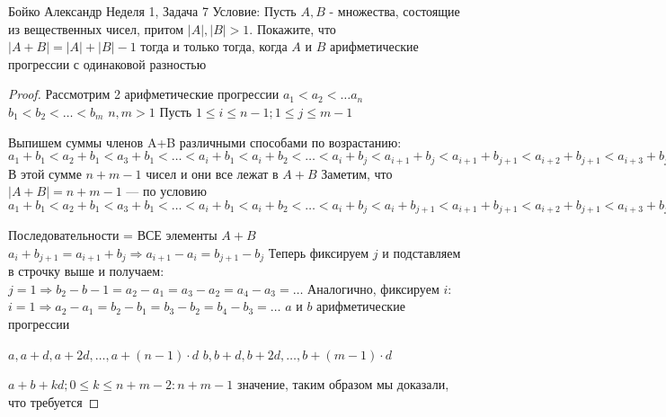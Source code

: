 \documentclass[a4paper,12pt]{article}
\numberwithin{equation}{section}
\theoremstyle{plain}
\theoremstyle{definition}
\theoremstyle{remark}
\begin{document}

Бойко Александр
\newline
\newline
Неделя 1, Задача 7 \newline
Условие:
 Пусть $A, B$ - множества, состоящие из вещественных чисел, притом $|A|, |B| > 1$. Покажите, что
$|A + B| = |A| + |B| - 1$ тогда и только тогда, когда $A$ и $B$ арифметические прогрессии с одинаковой разностью
\begin{proof}
Рассмотрим 2 арифметические прогрессии \newline
$a_1 < a_2 < \ldots a_n$ \newline
$b_1 < b_2 < \ldots < b_m$ \newline
$n,m > 1$ \newline
Пусть $1 \leq i \leq n-1; 1\leq j \leq m-1$

Выпишем суммы членов A+B различными способами по возрастанию: \newline
$a_1+b_1 < a_2+b_1<a_3+b_1<\ldots<a_i+b_1<a_i+b_2<\ldots<a_i+b_j<a_{i+1}+b_j<a_{i+1}+b_{j+1}<a_{i+2}+b_{j+1}<a_{i+3}+b_{j+1}<\ldots<a_n+b_{j+1}<a_n+b_{j+2}<\ldots<a_n+b_b$ \newline
В этой сумме $n+m-1$ чисел и они все лежат в $A+B$ \newline
Заметим, что $|A+B|=n+m-1$ --- по условию \newline
$a_1+b_1 < a_2+b_1<a_3+b_1<\ldots<a_i+b_1<a_i+b_2<\ldots<a_i+b_j<a_{i}+b_{j+1}<a_{i+1}+b_{j+1}<a_{i+2}+b_{j+1}<a_{i+3}+b_{j+1}<\ldots<a_n+b_{j+1}<a_n+b_{j+2}<\ldots<a_n+b_b$ \newline

Последовательности = ВСЕ элементы $A+B$ \newline
$a_i + b_{j+1}=a_{i+1}+b_j\Rightarrow a_{i+1}-a_i=b_{j+1}-b_j$ \newline
Теперь фиксируем $j$ и подставляем в строчку выше и получаем: \newline
$j=1 \Rightarrow b_2-b-1=a_2-a_1=a_3-a_2=a_4-a_3=\ldots$ \newline
Аналогично, фиксируем $i$:
$i=1 \Rightarrow a_2-a_1=b_2-b_1=b_3-b_2=b_4-b_3=\ldots$ \Rightarrow $a$ и $b$ арифметические прогрессии \newline

$a,a+d,a+2d,\ldots,a+(n-1)\cdot d$\newline
$b,b+d,b+2d,\ldots,b+(m-1)\cdot d$\newline

$a+b+kd; 0\leq k\leq n+m-2: n+m-1$ значение, таким образом мы доказали, что требуется




\end{proof}
\end{document}
